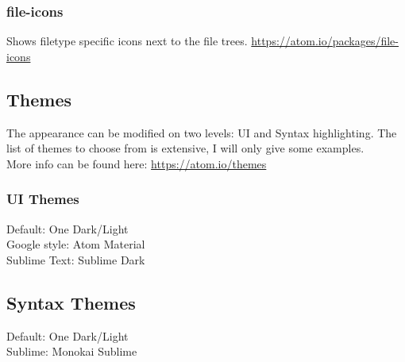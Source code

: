\documentclass[10pt,a4paper]{article}
\begin{document}
\subsubsection{file-icons}
Shows filetype specific icons next to the file trees. \url{https://atom.io/packages/file-icons}


\subsection{Themes}
The appearance can be modified on two levels: UI and Syntax highlighting. The list of themes to choose from is extensive, I will only give some examples.\\
More info can be found here: \url{https://atom.io/themes}

\subsubsection{UI Themes}
Default: One Dark/Light\\
Google style: Atom Material\\
Sublime Text: Sublime Dark

\subsection{Syntax Themes}
Default: One Dark/Light\\
Sublime: Monokai Sublime\\
\end{document}
